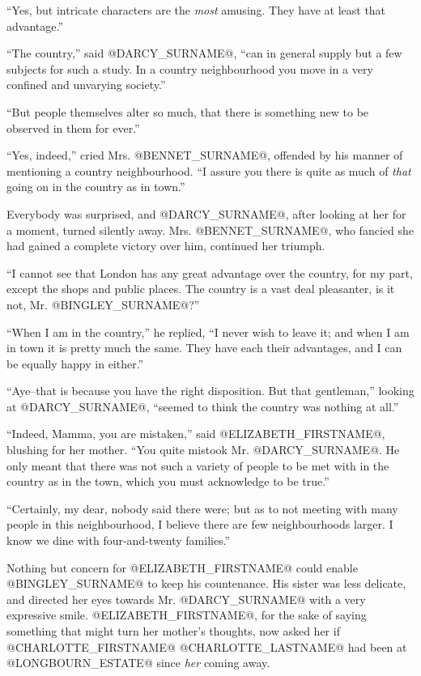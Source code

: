 ``Yes, but intricate characters are the \textit{most} amusing. They have at
least that advantage.''

``The country,'' said @DARCY_SURNAME@, ``can in general supply but a few subjects for
such a study. In a country neighbourhood you move in a very confined and
unvarying society.''

``But people themselves alter so much, that there is something new to be
observed in them for ever.''

``Yes, indeed,'' cried Mrs. @BENNET_SURNAME@, offended by his manner of mentioning
a country neighbourhood. ``I assure you there is quite as much of \textit{that}
going on in the country as in town.''

Everybody was surprised, and @DARCY_SURNAME@, after looking at her for a moment,
turned silently away. Mrs. @BENNET_SURNAME@, who fancied she had gained a complete
victory over him, continued her triumph.

``I cannot see that London has any great advantage over the country, for
my part, except the shops and public places. The country is a vast deal
pleasanter, is it not, Mr. @BINGLEY_SURNAME@?''

``When I am in the country,'' he replied, ``I never wish to leave it;
and when I am in town it is pretty much the same. They have each their
advantages, and I can be equally happy in either.''

``Aye--that is because you have the right disposition. But that
gentleman,'' looking at @DARCY_SURNAME@, ``seemed to think the country was nothing
at all.''

``Indeed, Mamma, you are mistaken,'' said @ELIZABETH_FIRSTNAME@, blushing for her
mother. ``You quite mistook Mr. @DARCY_SURNAME@. He only meant that there was not
such a variety of people to be met with in the country as in the town,
which you must acknowledge to be true.''

``Certainly, my dear, nobody said there were; but as to not meeting
with many people in this neighbourhood, I believe there are few
neighbourhoods larger. I know we dine with four-and-twenty families.''

Nothing but concern for @ELIZABETH_FIRSTNAME@ could enable @BINGLEY_SURNAME@ to keep his
countenance. His sister was less delicate, and directed her eyes towards
Mr. @DARCY_SURNAME@ with a very expressive smile. @ELIZABETH_FIRSTNAME@, for the sake of
saying something that might turn her mother's thoughts, now asked her if
@CHARLOTTE_FIRSTNAME@ @CHARLOTTE_LASTNAME@ had been at @LONGBOURN_ESTATE@ since \textit{her} coming away.

